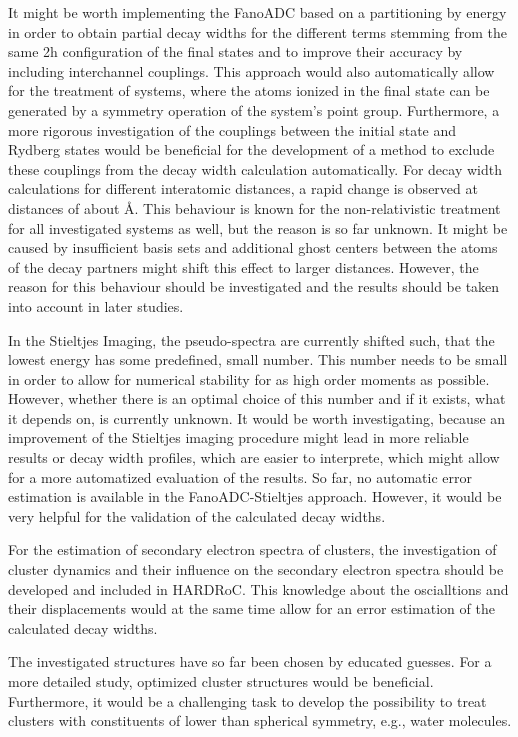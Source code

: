 It might be worth implementing the FanoADC based on a partitioning by energy in
order to obtain partial decay widths for the different terms stemming from the
same 2h configuration of the final states and to
improve their accuracy by including interchannel couplings. This approach
would also automatically allow for the treatment of systems, where the
atoms ionized in the final state can be generated by a symmetry operation
of the system's point group.
Furthermore, a more rigorous investigation of the couplings between the
initial state and Rydberg states would be beneficial for the development
of a method to exclude these couplings from the decay width calculation
automatically.
For decay width calculations for different interatomic distances,
a rapid change is observed at distances of about \unit[10 -- 15]{\AA}.
This behaviour is known for the non-relativistic treatment for all
investigated systems as well,
but the reason is so far unknown. It might be caused by insufficient
basis sets and additional ghost centers between the atoms of the decay partners
might shift this effect to larger distances. However, the reason for
this behaviour should be investigated and the results should be taken
into account in later studies.

In the Stieltjes Imaging, the pseudo-spectra are currently shifted such,
that the lowest energy has some predefined, small number. This number needs
to be small in order to allow for numerical stability for as high order
moments as possible. However, whether there is an optimal choice of this
number and if it exists, what it depends on, is currently unknown.
It would be worth investigating, because an improvement of the Stieltjes
imaging procedure might lead in more reliable results or decay width profiles,
which are easier to interprete, which might allow for a more automatized
evaluation of the results.
So far, no automatic error estimation is available in the FanoADC-Stieltjes
approach. However, it would be very helpful for the validation of the
calculated decay widths.

For the estimation of secondary electron spectra of clusters,
the investigation of cluster dynamics and their influence on the
secondary electron spectra should be developed and included in
HARDRoC. This knowledge about the oscialltions and their displacements
would at the same time allow for an error estimation of
the calculated decay widths.

The investigated structures have so far been chosen by educated guesses.
For a more detailed study, optimized cluster structures would be beneficial.
Furthermore, it would be a challenging task to develop the possibility to
treat clusters with constituents of lower than spherical symmetry, e.g.,
water molecules.
